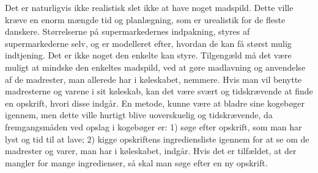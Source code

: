 Det er naturligvis ikke realistisk slet ikke at have noget madspild. Dette ville kræve en enorm mængde tid og planlægning, som er urealistik for de fleste danskere. Størrelserne på supermarkedernes indpakning, styres af supermarkederne selv, og er modelleret efter, hvordan de kan få størst mulig indtjening. Det er ikke noget den enkelte kan styre. Tilgengæld må det være muligt at mindske den enkeltes madspild, ved at gøre madlavning og anvendelse af de madrester, man allerede har i køleskabet, nemmere. Hvis man vil benytte madresterne og varene i sit køleskab, kan det være svært og tidskrævende at finde en opskrift, hvori disse indgår. En metode, kunne være at bladre sine kogebøger igennem, men dette ville hurtigt blive uoverskuelig og tidskrævende, da fremgangsmåden ved opslag i kogebøger er: 1) søge efter opskrift, som man har lyst og tid til at lave; 2) kigge opskriftens ingrediensliste igennem for at se om de madrester og varer, man har i køleskabet, indgår. Hvis det er tilfældet, at der mangler for mange ingredienser, så skal man søge efter en ny opskrift.
